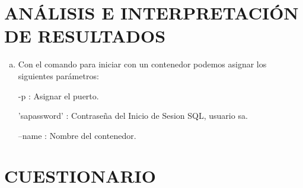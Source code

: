 \documentclass[preprint,12pt]{elsarticle}
\begin{document}
\section{ANÁLISIS E INTERPRETACIÓN DE RESULTADOS}
\begin{enumerate}[a)]
\item Con el comando para iniciar con un contenedor podemos asignar los siguientes parámetros:
\begin{center} -p : 	Asignar el puerto.\end{center}
\begin{center}'sapassword' : Contraseña del Inicio de Sesion SQL, usuario sa.\end{center}
\begin{center} --name : Nombre del contenedor.\end{center}
\end{enumerate}


\section{CUESTIONARIO}
\end{document}
